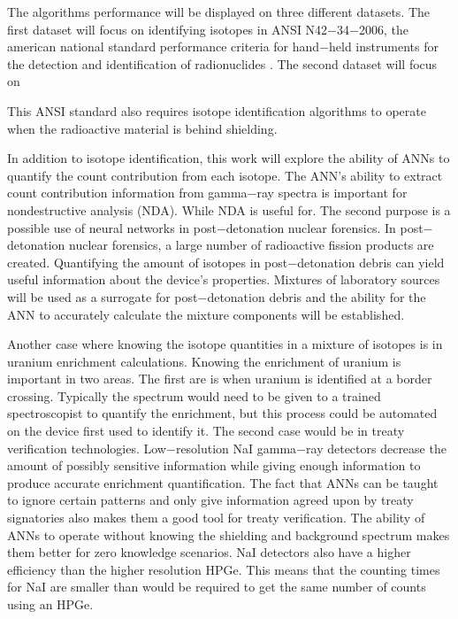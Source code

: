\documentclass[tocnosub,noragright,centerchapter,12pt,fullpage]{uiucecethesis09}
\begin{document}
The algorithms performance will be displayed on three different datasets. The first dataset will focus on identifying isotopes in ANSI N42$-$34$-$2006, the american national
standard performance criteria for hand$-$held instruments for the detection and identification of radionuclides \cite{ANSI}. The second dataset will focus on 

This ANSI standard also requires isotope identification algorithms to operate when the radioactive material is behind shielding.



In addition to isotope identification, this work will explore the ability of ANNs to quantify the count contribution from each isotope. The ANN's ability to extract count contribution information from gamma$-$ray spectra is important for nondestructive analysis (NDA). While NDA is useful for. The second purpose is a possible use of neural networks in post$-$detonation nuclear forensics. In post$-$detonation nuclear forensics, a large number of radioactive fission products are created. Quantifying the amount of isotopes in post$-$detonation debris can yield useful information about the device's properties. Mixtures of laboratory sources will be used as a surrogate for post$-$detonation debris and the ability for the ANN to accurately calculate the mixture components will be established.   

Another case where knowing the isotope quantities in a mixture of isotopes is in uranium enrichment calculations. Knowing the enrichment of uranium is important in two areas. The first are is when uranium is identified at a border crossing. Typically the spectrum would need to be given to a trained spectroscopist to quantify the enrichment, but this process could be automated on the device first used to identify it. The second case would be in treaty verification technologies. Low$-$resolution NaI gamma$-$ray detectors decrease the amount of possibly sensitive information while giving enough information to produce accurate enrichment quantification. The fact that ANNs can be taught to ignore certain patterns and only give information agreed upon by treaty signatories also makes them a good tool for treaty verification. The ability of ANNs to operate without knowing the shielding and background spectrum makes them better for zero knowledge scenarios. NaI detectors also have a higher efficiency than the higher resolution HPGe. This means that the counting times for NaI are smaller than would be required to get the same number of counts using an HPGe. 
\end{document}

